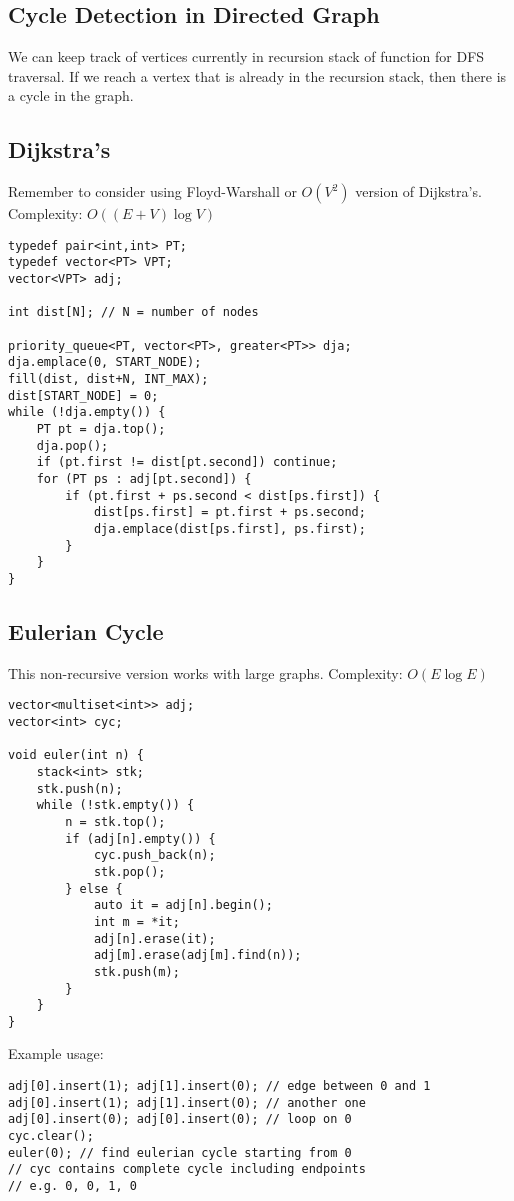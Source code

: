 \documentclass[letterpaper]{article}
\begin{document}
\clearpage

\subsection{Cycle Detection in Directed Graph}

We can keep track of vertices currently in recursion stack of function for DFS traversal. If we reach a vertex that is already in the recursion stack, then there is a cycle in the graph.

\subsection{Dijkstra's}

Remember to consider using Floyd-Warshall or $O\left(V^2\right)$ version of Dijkstra's. Complexity: $O\left(\left(E+V\right)\log V\right)$

\begin{lstlisting}
typedef pair<int,int> PT;
typedef vector<PT> VPT;
vector<VPT> adj;

int dist[N]; // N = number of nodes

priority_queue<PT, vector<PT>, greater<PT>> dja;
dja.emplace(0, START_NODE);
fill(dist, dist+N, INT_MAX);
dist[START_NODE] = 0;
while (!dja.empty()) {
	PT pt = dja.top();
	dja.pop();
	if (pt.first != dist[pt.second]) continue;
	for (PT ps : adj[pt.second]) {
		if (pt.first + ps.second < dist[ps.first]) {
			dist[ps.first] = pt.first + ps.second;
			dja.emplace(dist[ps.first], ps.first);
		}
	}
}
\end{lstlisting}

\subsection{Eulerian Cycle}

This non-recursive version works with large graphs. Complexity: $O(E\log E)$

\begin{lstlisting}
vector<multiset<int>> adj;
vector<int> cyc;

void euler(int n) {
	stack<int> stk;
	stk.push(n);
	while (!stk.empty()) {
		n = stk.top();
		if (adj[n].empty()) {
			cyc.push_back(n);
			stk.pop();
		} else {
			auto it = adj[n].begin();
			int m = *it;
			adj[n].erase(it);
			adj[m].erase(adj[m].find(n));
			stk.push(m);
		}
	}
}
\end{lstlisting}

Example usage:
\begin{lstlisting}
adj[0].insert(1); adj[1].insert(0); // edge between 0 and 1
adj[0].insert(1); adj[1].insert(0); // another one
adj[0].insert(0); adj[0].insert(0); // loop on 0
cyc.clear();
euler(0); // find eulerian cycle starting from 0
// cyc contains complete cycle including endpoints
// e.g. 0, 0, 1, 0
\end{lstlisting}
\end{document}
